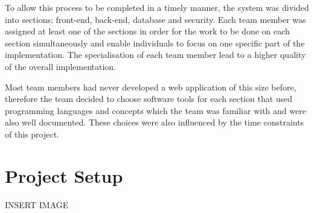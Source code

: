\documentclass{l3proj}
\begin{document}
To allow this process to be completed in a timely manner, the system was divided into sections; front-end, back-end, database and security. Each team member was assigned  at least one of the sections in order for the work to be done on each section simultaneously and enable individuals to focus on one specific part of the implementation. The specialisation of each team member lead to a higher quality of the overall implementation.

Most team members had never developed a web application of this size before, therefore the team decided to choose software tools for each section that used programming languages and concepts which the team was familiar with and were also well documented. These choices were also influenced by the time constraints of this project.

\section{Project Setup}
{\LARGE{INSERT IMAGE}}
\end{document}
